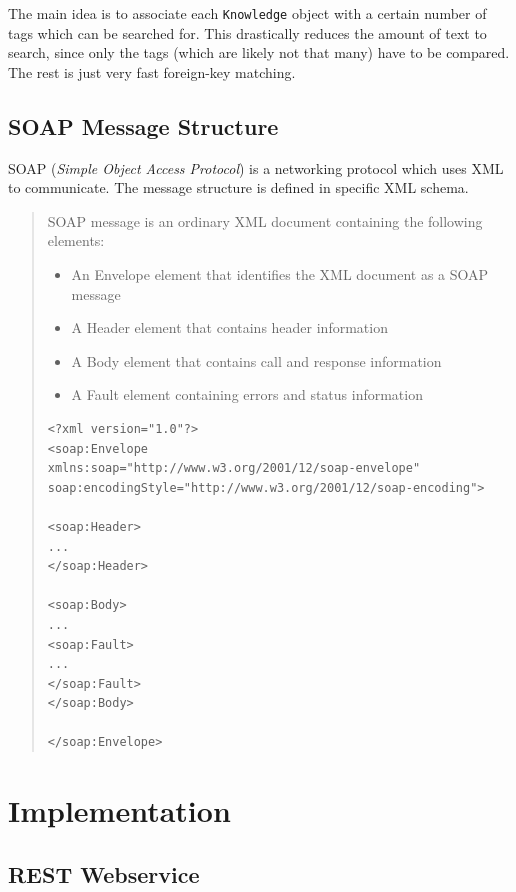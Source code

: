 \documentclass[11pt, a4paper]{article}
\begin{document}
The main idea is to associate each \lstinline|Knowledge| object with a certain number of tags which can be searched for. This drastically reduces the amount of text to search, since only the tags (which are likely not that many) have to be compared. The rest is just very fast foreign-key matching.

\subsection{SOAP Message Structure}

SOAP (\textit{Simple Object Access Protocol}) is a networking protocol which uses XML to communicate. The message structure is defined in specific XML schema.

\begin{quote}
SOAP message is an ordinary XML document containing the following elements:

\begin{itemize}
	\item An Envelope element that identifies the XML document as a SOAP message
	\item A Header element that contains header information
	\item A Body element that contains call and response information
	\item A Fault element containing errors and status information
\end{itemize}
	
\begin{lstlisting}
<?xml version="1.0"?>
<soap:Envelope
xmlns:soap="http://www.w3.org/2001/12/soap-envelope"
soap:encodingStyle="http://www.w3.org/2001/12/soap-encoding">
	
<soap:Header>
...
</soap:Header>
	
<soap:Body>
...
<soap:Fault>
...
</soap:Fault>
</soap:Body>
	
</soap:Envelope>
\end{lstlisting}
\vspace{10pt}
\cite{soap}

\end{quote}

\section{Implementation}

\subsection{REST Webservice}
\end{document}
